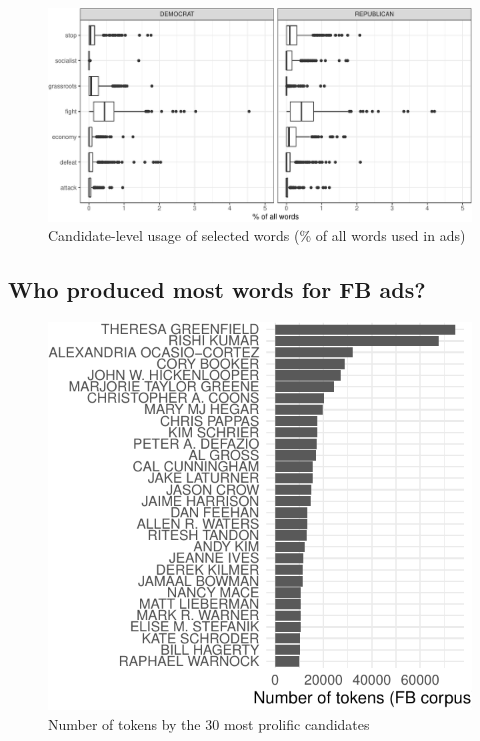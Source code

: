 \documentclass[
  12pt,
]{article}
\begin{document}
\begin{figure}
\centering
\includegraphics{figsFB/unnamed-chunk-3-1.pdf}
\caption{\label{fig:unnamed-chunk-3}Candidate-level usage of selected words (\% of all words used in ads)}
\end{figure}

\hypertarget{who-produced-most-words-for-fb-ads}{%
\subsection{Who produced most words for FB ads?}\label{who-produced-most-words-for-fb-ads}}

\begin{figure}
\centering
\includegraphics{figsFB/unnamed-chunk-4-1.pdf}
\caption{\label{fig:unnamed-chunk-4}Number of tokens by the 30 most prolific candidates}
\end{figure}
\end{document}
